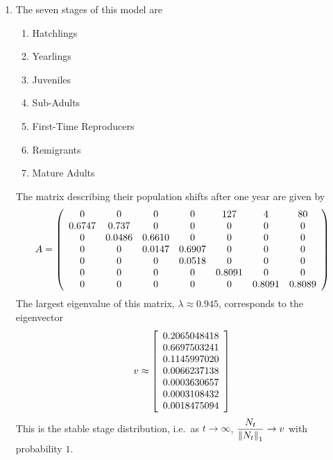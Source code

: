 \documentclass{article} %
\theoremstyle{plain}
\numberwithin{equation}{section} %
\numberwithin{figure}{section} %
\numberwithin{table}{section} %
\begin{document}
\begin{enumerate}[\ \ (a)]
    \item
        The seven stages of this model are
        \begin{enumerate}
            \item Hatchlings
            \item Yearlings
            \item Juveniles
            \item Sub-Adults
            \item First-Time Reproducers
            \item Remigrants
            \item Mature Adults
        \end{enumerate}
        The matrix describing their population shifts after one year are given by
        \begin{align*}
            A = \qty(\begin{array}{ccccccc}
                0 & 0 & 0 & 0 & 127 & 4 & 80 \\
                0.6747 & 0.737 & 0 & 0 & 0 & 0 & 0 \\
                0 & 0.0486 & 0.6610 & 0 & 0 & 0 & 0 \\
                0 & 0 & 0.0147 & 0.6907 & 0 & 0 & 0 \\
                0 & 0 & 0 & 0.0518 & 0 & 0 & 0 \\
                0 & 0 & 0 & 0 & 0.8091 & 0 & 0 \\
                0 & 0 & 0 & 0 & 0 & 0.8091 & 0.8089
            \end{array})
        \end{align*}
        The largest eigenvalue of this matrix, $\lambda \approx 0.945$, corresponds to the eigenvector
        \begin{align*}
            v \approx \qty[\begin{array}{c} 0.2065048418 \\ 0.6697503241 \\ 0.1145997020 \\ 0.0066237138 \\ 0.0003630657 \\ 0.0003108432 \\ 0.0018475094\end{array}]
        \end{align*}
        This is the stable stage distribution, i.e.~as $t \rightarrow \infty$, $\dfrac{N_t}{\norm{N_t}_1} \rightarrow v$ with probability $1$.

\end{enumerate}
\end{document}
